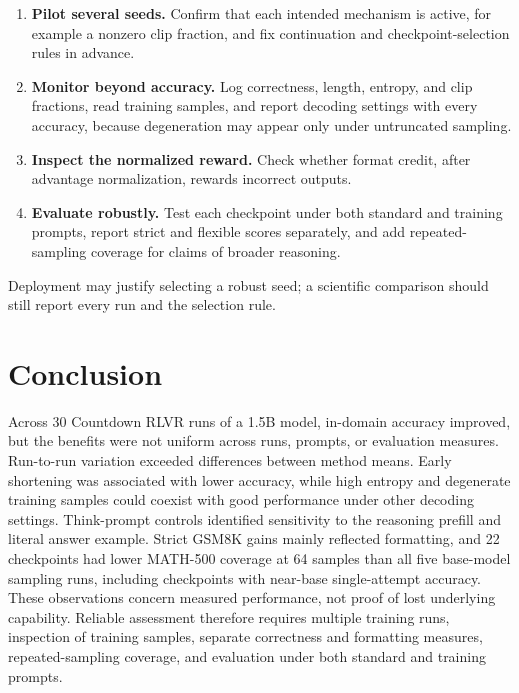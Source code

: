 \documentclass[ai,article,submit,oneauthor]{Definitions/mdpi}
\begin{document}
\begin{enumerate}
\item \textbf{Pilot several seeds.} Confirm that each intended mechanism is active, for example a nonzero clip fraction, and fix continuation and checkpoint-selection rules in advance.
\item \textbf{Monitor beyond accuracy.} Log correctness, length, entropy, and clip fractions, read training samples, and report decoding settings with every accuracy, because degeneration may appear only under untruncated sampling.
\item \textbf{Inspect the normalized reward.} Check whether format credit, after advantage normalization, rewards incorrect outputs.
\item \textbf{Evaluate robustly.} Test each checkpoint under both standard and training prompts, report strict and flexible scores separately, and add repeated-sampling coverage for claims of broader reasoning.
\end{enumerate}

Deployment may justify selecting a robust seed; a scientific comparison should still report every run and the selection rule.

\section{Conclusion}\label{sec:conclusion}

Across 30 Countdown RLVR runs of a 1.5B model, in-domain accuracy improved, but the benefits were not uniform across runs, prompts, or evaluation measures. Run-to-run variation exceeded differences between method means. Early shortening was associated with lower accuracy, while high entropy and degenerate training samples could coexist with good performance under other decoding settings. Think-prompt controls identified sensitivity to the reasoning prefill and literal answer example. Strict GSM8K gains mainly reflected formatting, and 22 checkpoints had lower MATH-500 coverage at 64 samples than all five base-model sampling runs, including checkpoints with near-base single-attempt accuracy. These observations concern measured performance, not proof of lost underlying capability. Reliable assessment therefore requires multiple training runs, inspection of training samples, separate correctness and formatting measures, repeated-sampling coverage, and evaluation under both standard and training prompts.

\end{document}
